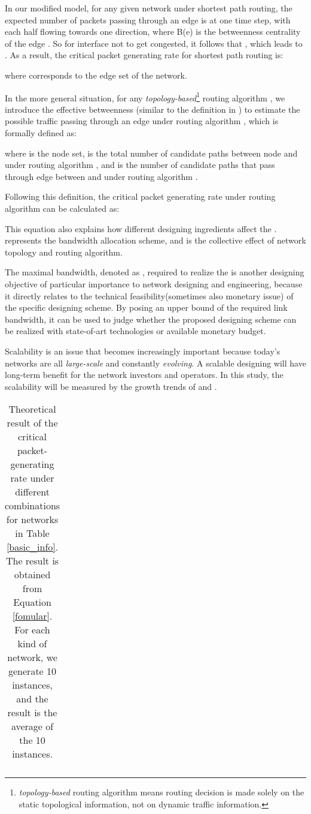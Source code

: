 \documentclass[journal]{IEEEtran}
\begin{document}
{In our modified model, for any given network under shortest path
routing, the expected number of packets passing through an edge is
 at one time step, with each half flowing
towards one direction, where B(e) is the betweenness centrality of
the edge . So for interface  not to get congested, it
follows that ,
which leads to . As a result, the
critical packet generating rate  for shortest path routing is:

where  corresponds to the edge set of the network.

In the more general situation, for any
\emph{topology-based}\footnote{\emph{topology-based} routing
algorithm means routing decision is made solely on the static
topological information, not on dynamic traffic information.}
routing algorithm , we introduce the effective betweenness
 (similar to the definition in
\cite{efficient-routing}) to estimate the possible traffic passing
through an edge under routing algorithm , which is formally
defined as:

where  is the node set,  is the total
number of candidate paths between node  and  under routing
algorithm , and  is the number
of candidate paths that pass through edge  between  and 
under routing algorithm .

Following this definition, the critical packet generating rate 
under routing algorithm  can be calculated as:


This equation also explains how different designing ingredients
affect the .  represents the bandwidth allocation scheme,
and  is the collective effect of network topology and
routing algorithm.


 The maximal bandwidth, denoted as , required to realize the  is another
designing objective of particular importance to network designing
and engineering, because it directly relates to the technical
feasibility(sometimes also monetary issue) of the specific designing
scheme. By posing an upper bound of the required link bandwidth, it
can be used to judge whether the proposed designing scheme can be
realized with state-of-art technologies or available monetary
budget.

Scalability is an issue that becomes increasingly important because
today's networks are all \emph{large-scale} and constantly
\emph{evolving}. A scalable designing will have long-term benefit
for the network investors and operators. In this study, the
scalability will be measured by the growth trends of  and
.

\begin{table*}[!t]
\renewcommand{\arraystretch}{1.3}
\centering
 \caption{Theoretical result of the critical
packet-generating rate  under different combinations for
networks in Table \ref{basic_info}. The result is obtained from
Equation \ref{fomular}. For each kind of network, we generate 10
instances, and the result is the average of the 10 instances. }
\label{theoretical_result}
\begin{tabular}{c|ccccc}
\hline


\end{tabular}
\end{table*}}
\end{document}

